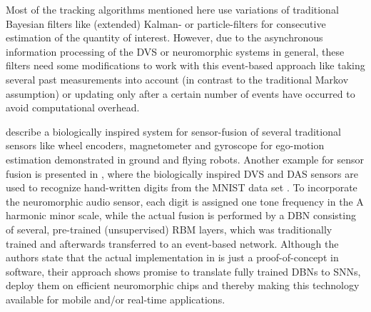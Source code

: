 Most of the tracking algorithms mentioned here use variations of traditional Bayesian filters like (extended) Kalman- or particle-filters \parencite{Thrun2005} for consecutive estimation of the quantity of interest.
However, due to the asynchronous information processing of the \ac{DVS} or neuromorphic systems in general, these filters need some modifications to work with this event-based approach \parencite{Weikersdorfer2013} like taking several past measurements into account (in contrast to the traditional Markov assumption) or updating only after a certain number of events have occurred to avoid computational overhead.

\textcite{Axenie2015} describe a biologically inspired system for sensor-fusion of several traditional sensors like wheel encoders, magnetometer and gyroscope for ego-motion estimation demonstrated in ground and flying robots.
Another example for sensor fusion is presented in \textcite{OConnor2013}, where the biologically inspired \ac{DVS} and \ac{DAS} sensors are used to recognize hand-written digits from the \ac{MNIST} data set \parencite{LeCun1998}.
To incorporate the neuromorphic audio sensor, each digit is assigned one tone frequency in the A harmonic minor scale, while the actual fusion is performed by a \ac{DBN} consisting of several, pre-trained (unsupervised) \ac{RBM} layers, which was traditionally trained and afterwards transferred to an event-based network.
Although the authors state that the actual implementation in \textcite{OConnor2013} is just a proof-of-concept in software, their approach shows promise to translate fully trained \acp{DBN} to \acp{SNN}, deploy them on efficient neuromorphic chips and thereby making this technology available for mobile and/or real-time applications.


